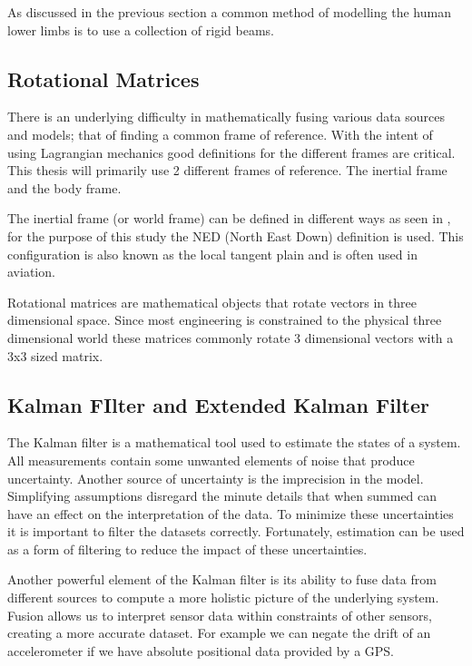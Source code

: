 As discussed in the previous section a common method of modelling the human lower limbs is to use a collection of rigid beams. 


\subsection{Rotational Matrices}
There is an underlying difficulty in mathematically fusing various data sources and models; that of finding a common frame of reference. With the intent of using Lagrangian mechanics good definitions for the different frames are critical. This thesis will primarily use 2 different frames of reference. The inertial frame and the body frame.

The inertial frame (or world frame) can be defined in different ways as seen in \cite{soechting1992moving}, for the purpose of this study  the NED (North East Down) definition is used. This configuration is also known as the local tangent plain and is often used in aviation. 

Rotational matrices are mathematical objects that rotate vectors in three dimensional space. Since most engineering is constrained to the physical three dimensional world these matrices commonly rotate 3 dimensional vectors with a 3x3 sized matrix. 



\subsection{Kalman FIlter and Extended Kalman Filter}
The Kalman filter is a mathematical tool used to estimate the states of a system. All measurements contain some unwanted elements of noise that produce uncertainty. Another source of uncertainty is the imprecision in the model. Simplifying assumptions disregard the minute details that when summed can have an effect on the interpretation of the data. To minimize these uncertainties it is important to filter the datasets correctly. Fortunately, estimation can be used as a form of filtering to reduce the impact of these uncertainties.    

Another powerful element of the Kalman filter is its ability to fuse data from different sources to compute a more holistic picture of the underlying system. Fusion allows us to interpret sensor data within constraints of other sensors, creating a more accurate dataset. For example we can negate the drift of an accelerometer if we have absolute positional data provided by a GPS. 

